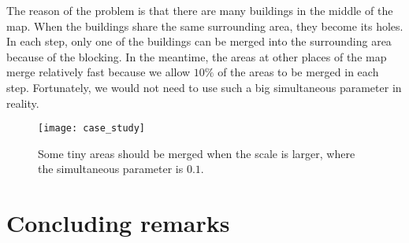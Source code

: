 \documentclass[twocolumn]{svjour3}          %
\begin{document}
The reason of the problem is that 
there are many buildings in the middle of the map.
When the buildings share the same surrounding area,
they become its holes.
In each step, only one of the buildings can be merged into the surrounding area
because of the blocking.
In the meantime, the areas at other places of the map merge relatively fast
because we allow $10\%$ of the areas to be merged in each step.
Fortunately, we would not need to use such a big simultaneous parameter in reality.


\begin{figure}[tb]
\centering
\texttt{[image: case\_study]}
\caption{
    Some tiny areas should be merged when the scale is larger,
    where the simultaneous parameter is $0.1$.
}
\label{fig:problem}
\end{figure}





\section{Concluding remarks}
\label{sec:concluding_remarks}
\end{document}
